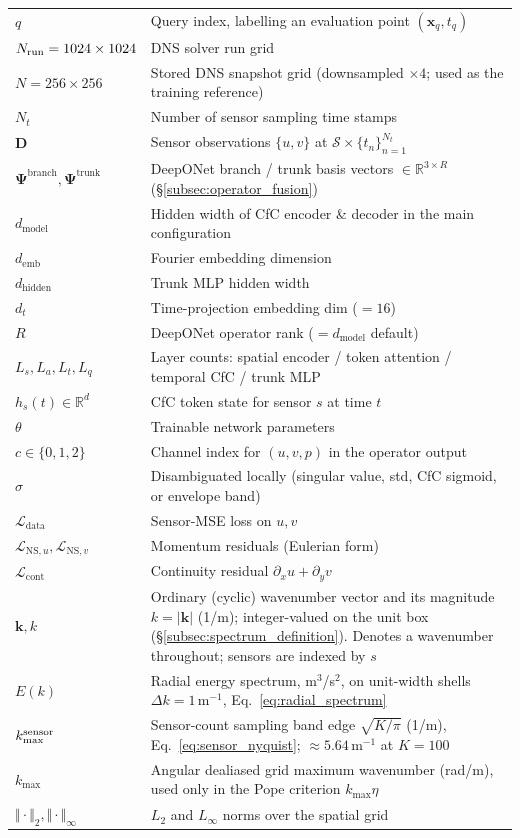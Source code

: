 \begin{minipage}{\textwidth}
\begin{tabularx}{\textwidth}{@{}>{\raggedright\arraybackslash}p{3.2cm} >{\raggedright\arraybackslash}X@{}}
$q$ & Query index, labelling an evaluation point $(\mathbf{x}_q, t_q)$ \\
$N_{\rm run} = 1024\times 1024$ & DNS solver run grid \\
$N = 256\times 256$ & Stored DNS snapshot grid (downsampled $\times 4$; used as the training reference) \\
$N_t$ & Number of sensor sampling time stamps \\
$\mathbf{D}$ & Sensor observations $\{u,v\}$ at $\mathcal{S}\times\{t_n\}_{n=1}^{N_t}$ \\
$\boldsymbol{\Psi}^{\text{branch}}, \boldsymbol{\Psi}^{\text{trunk}}$ & DeepONet branch / trunk basis vectors $\in\mathbb{R}^{3\times R}$ (\S\ref{subsec:operator_fusion}) \\
$d_{\text{model}}$ & Hidden width of CfC encoder \& decoder in the main configuration \\
$d_{\text{emb}}$ & Fourier embedding dimension \\
$d_{\text{hidden}}$ & Trunk MLP hidden width \\
$d_t$ & Time-projection embedding dim ($=16$) \\
$R$ & DeepONet operator rank ($=d_{\text{model}}$ default) \\
$L_s, L_a, L_t, L_q$ & Layer counts: spatial encoder / token attention / temporal CfC / trunk MLP \\
$h_s(t) \in \mathbb{R}^d$ & CfC token state for sensor $s$ at time $t$ \\
$\theta$ & Trainable network parameters \\
$c \in \{0,1,2\}$ & Channel index for $(u, v, p)$ in the operator output \\
$\sigma$ & Disambiguated locally (singular value, std, CfC sigmoid, or envelope band) \\
$\mathcal{L}_{\text{data}}$ & Sensor-MSE loss on $u,v$ \\
$\mathcal{L}_{\text{NS},u}, \mathcal{L}_{\text{NS},v}$ & Momentum residuals (Eulerian form) \\
$\mathcal{L}_{\text{cont}}$ & Continuity residual $\partial_x u + \partial_y v$ \\
$\mathbf{k}, k$ & Ordinary (cyclic) wavenumber vector and its magnitude $k=\vert\mathbf{k}\vert$ (1/m); integer-valued on the unit box (\S\ref{subsec:spectrum_definition}). Denotes a wavenumber throughout; sensors are indexed by $s$ \\
$E(k)$ & Radial energy spectrum, m$^3$/s$^2$, on unit-width shells $\Delta k = 1$\,m$^{-1}$, Eq.~\eqref{eq:radial_spectrum} \\
$k_{\max}^{\rm sensor}$ & Sensor-count sampling band edge $\sqrt{K/\pi}$ (1/m), Eq.~\eqref{eq:sensor_nyquist}; $\approx 5.64$\,m$^{-1}$ at $K=100$ \\
$k_{\max}$ & Angular dealiased grid maximum wavenumber (rad/m), used only in the Pope criterion $k_{\max}\eta$ \\
$\Vert\cdot\Vert_2, \Vert\cdot\Vert_\infty$ & $L_2$ and $L_\infty$ norms over the spatial grid \\
\end{tabularx}
\end{minipage}
